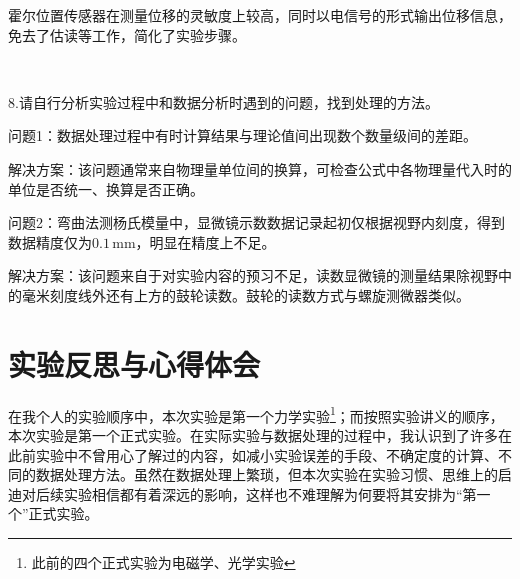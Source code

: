 \documentclass[UTF-8,twoside,cs4size]{ctexart}
\begin{document}
	{\kaishu 霍尔位置传感器在测量位移的灵敏度上较高，同时以电信号的形式输出位移信息，免去了估读等工作，简化了实验步骤。}
	
	~\
	
	8.请自行分析实验过程中和数据分析时遇到的问题，找到处理的方法。
	
	{\fangsong 问题1：数据处理过程中有时计算结果与理论值间出现数个数量级间的差距。}
	
	{\kaishu 解决方案：该问题通常来自物理量单位间的换算，可检查公式中各物理量代入时的单位是否统一、换算是否正确。}
	
	{\fangsong 问题2：弯曲法测杨氏模量中，显微镜示数数据记录起初仅根据视野内刻度，得到数据精度仅为$ 0.1\,\mathrm{mm} $，明显在精度上不足。}
	
	{\kaishu 解决方案：该问题来自于对实验内容的预习不足，读数显微镜的测量结果除视野中的毫米刻度线外还有上方的鼓轮读数。鼓轮的读数方式与螺旋测微器类似。}
	
	\section{实验反思与心得体会}
	在我个人的实验顺序中，本次实验是第一个力学实验\footnote{此前的四个正式实验为电磁学、光学实验}；而按照实验讲义的顺序，本次实验是第一个正式实验。在实际实验与数据处理的过程中，我认识到了许多在此前实验中不曾用心了解过的内容，如减小实验误差的手段、不确定度的计算、不同的数据处理方法。虽然在数据处理上繁琐，但本次实验在实验习惯、思维上的启迪对后续实验相信都有着深远的影响，这样也不难理解为何要将其安排为“第一个”正式实验。
\end{document}
